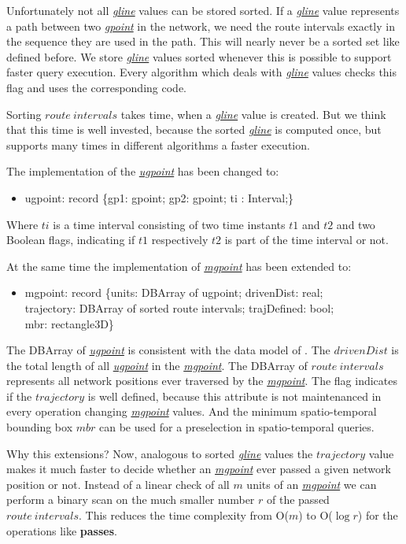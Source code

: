\documentclass[a4paper]{article}
\newcommand{\op}[1]{\textbf{#1}}
\newcommand{\dt}[1]{\textsl{\underline{#1}}}
\begin{document}
Unfortunately not all \dt{gline} values can be stored sorted. If a \dt{gline}
value represents a path between two \dt{gpoint} in the network, we need the
route intervals exactly in the sequence they are used in the path. This will
nearly never be a sorted set like defined before.  We store \dt{gline}
values sorted whenever this is possible to support faster query execution.
Every algorithm which deals with \dt{gline} values checks this flag and uses
the corresponding code.

Sorting $route\ intervals$ takes time, when a \dt{gline} value is created. But
we think that this time is well invested, because the sorted \dt{gline} is computed
once, but supports many times in different algorithms a faster execution.

The implementation of the \dt{ugpoint} has been changed to:
\begin{ttfamily}
\begin{itemize}
  \item [] ugpoint: record \{gp1: gpoint; gp2: gpoint; ti : Interval;\}
\end{itemize}
\end{ttfamily}
Where $ti$ is a time interval consisting of two time instants $t1$ and $t2$ and
two Boolean flags, indicating if $t1$ respectively $t2$ is part of the time interval
or not.

At the same time the implementation of \dt{mgpoint} has been extended to:
\begin{ttfamily}
\begin{itemize}
  \item [] mgpoint: record \{units: DBArray of ugpoint; drivenDist: real;\\
trajectory: DBArray of sorted route intervals; trajDefined: bool;\\
mbr: rectangle3D\}
\end{itemize}
\end{ttfamily}
The DBArray of \dt{ugpoint} is consistent with the data model of \cite{NetworkGueting}.
The $drivenDist$ is the total length of all \dt{ugpoint} in the \dt{mgpoint}.
The DBArray of $route\ intervals$ represents all network positions ever traversed
by the \dt{mgpoint}. The flag indicates if the $trajectory$ is well defined,
because this attribute is not maintenanced in every operation changing \dt{mgpoint}
values. And the minimum spatio-temporal bounding box $mbr$ can be used for a preselection
in spatio-temporal queries.

Why this extensions?
Now, analogous to sorted \dt{gline} values the $trajectory$ value makes it much
faster to decide whether an \dt{mgpoint} ever passed a given network position or
not. Instead of a linear check of all $m$ units of an \dt{mgpoint} we can perform
a binary scan on the much smaller number $r$ of the passed $route\ intervals$.
This reduces the time complexity from O($m$) to O($\log r$) for the operations
like \op{passes}.
\end{document}
